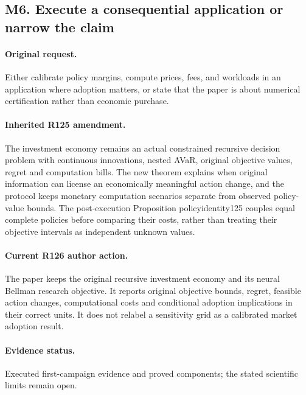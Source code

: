 \subsection*{M6. Execute a consequential application or narrow the claim}
\paragraph{Original request.} Either calibrate policy margins, compute prices, fees, and workloads in an application where adoption matters, or state that the paper is about numerical certification rather than economic purchase.

\paragraph{Inherited R125 amendment.} The investment economy remains an actual constrained recursive decision problem with continuous innovations, nested AVaR, original objective values, regret and computation bills. The new theorem explains when original information can license an economically meaningful action change, and the protocol keeps monetary computation scenarios separate from observed policy-value bounds. The post-execution Proposition policyidentity125 couples equal complete policies before comparing their costs, rather than treating their objective intervals as independent unknown values.

\paragraph{Current R126 author action.} The paper keeps the original recursive investment economy and its neural Bellman research objective. It reports original objective bounds, regret, feasible action changes, computational costs and conditional adoption implications in their correct units. It does not relabel a sensitivity grid as a calibrated market adoption result.

\paragraph{Evidence status.} Executed first-campaign evidence and proved components; the stated scientific limits remain open.

